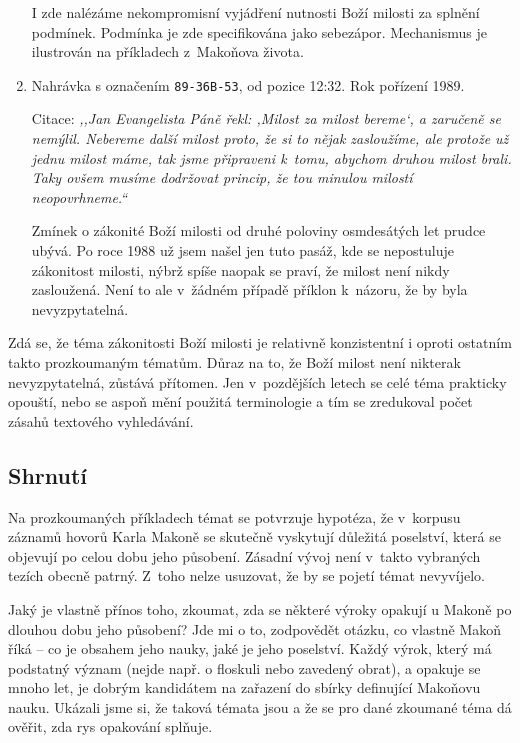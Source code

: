 \begin{enumerate}
{    I zde nalézáme nekompromisní vyjádření nutnosti Boží milosti za splnění
    podmínek. Podmínka je zde specifikována jako sebezápor. Mechanismus je
    ilustrován na příkladech z~Makoňova života.
  }
  \item{
    Nahrávka s označením \texttt{89-36B-53}, od pozice 12:32.
    Rok pořízení 1989.

    Citace: \textit{%
      ,,Jan Evangelista Páně řekl: ,Milost za milost bereme`, a zaručeně se
      nemýlil. Nebereme další milost proto, že si to nějak zasloužíme, ale
      protože už jednu milost máme, tak jsme připraveni k~tomu, abychom druhou
      milost brali. Taky ovšem musíme dodržovat princip, že tou minulou milostí
      neopovrhneme.``
    }

    Zmínek o zákonité Boží milosti od druhé poloviny osmdesátých let prudce
    ubývá. Po roce 1988 už jsem našel jen tuto pasáž, kde se nepostuluje
    zákonitost milosti, nýbrž spíše naopak se praví, že milost není nikdy
    zasloužená. Není to ale v~žádném případě příklon k~názoru, že by byla
    nevyzpytatelná.
  }
\end{enumerate}

Zdá se, že téma zákonitosti Boží milosti je relativně konzistentní i oproti
ostatním takto prozkoumaným tématům. Důraz na to, že Boží milost není nikterak
nevyzpytatelná, zůstává přítomen. Jen v~pozdějších letech se celé téma prakticky
opouští, nebo se aspoň mění použitá terminologie a tím se zredukoval počet
zásahů textového vyhledávání.

\subsection{Shrnutí}

Na prozkoumaných příkladech témat se potvrzuje hypotéza, že v~korpusu záznamů
hovorů Karla Makoně se skutečně vyskytují důležitá poselství, která se objevují
po celou dobu jeho působení. Zásadní vývoj není v~takto vybraných tezích obecně
patrný. Z~toho nelze usuzovat, že by se pojetí témat nevyvíjelo.

Jaký je vlastně přínos toho, zkoumat, zda se některé výroky opakují u Makoně po
dlouhou dobu jeho působení? Jde mi o to, zodpovědět otázku, co vlastně Makoň
říká -- co je obsahem jeho nauky, jaké je jeho poselství. Každý výrok, který má
podstatný význam (nejde např. o floskuli nebo zavedený obrat), a opakuje se
mnoho let, je dobrým kandidátem na zařazení do sbírky definující Makoňovu nauku.
Ukázali jsme si, že taková témata jsou a že se pro dané zkoumané téma dá ověřit,
zda rys opakování splňuje.

